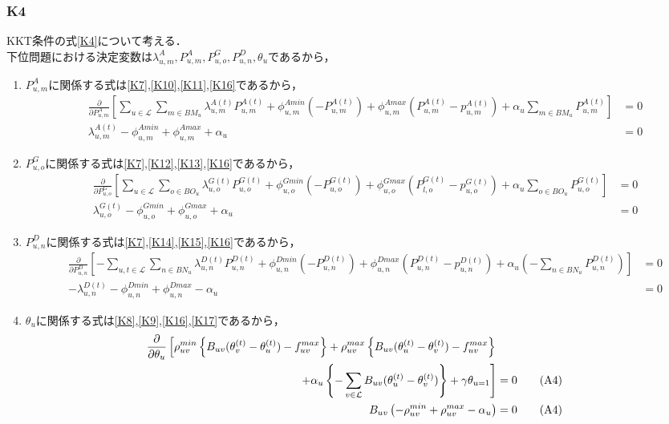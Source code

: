 \documentclass[a4j,10.5pt,fleqn]{jarticle}
\begin{document}
\subsubsection{K4}
KKT条件の式\ref{K4}について考える．\\
下位問題における決定変数は$\lambda_{u,m}^{A},P_{u,m}^A,P_{u,o}^G,P_{u,n}^D,\theta_u$であるから，
\begin{enumerate}
\item $P_{u,m}^A$に関係する式は\ref{K7},\ref{K10},\ref{K11},\ref{K16}であるから，
\begin{align}
&\frac{\partial}{\partial P_{u,m}^A}\left[\sum_{u\in \mathcal{L}}\sum_{m\in BM_u}\lambda^{A(t)}_{u,m}P^{A(t)}_{u,m}+\phi_{u,m}^{Amin}(-P_{u,m}^{A(t)})+\phi_{u,m}^{Amax}(P_{u,m}^{A(t)}-p_{u,m}^{A(t)})+\alpha_u\sum_{m\in BM_u}P^{A(t)}_{u,m}\right]&=0\tag{A1}\\
&\lambda^{A(t)}_{u,m}-\phi_{u,m}^{Amin}+\phi_{u,m}^{Amax}+\alpha_u&=0\tag{A1}\label{A1}
\end{align}
\item $P_{u,o}^G$に関係する式は\ref{K7},\ref{K12},\ref{K13},\ref{K16}であるから，
\begin{align}
&\frac{\partial}{\partial P_{u,o}^G}\left[\sum_{u\in \mathcal{L}}\sum_{o\in BO_u}\lambda^{G(t)}_{u,o}P^{G(t)}_{u,o}+\phi_{u,o}^{Gmin}(-P_{u,o}^{G(t)})+\phi_{u,o}^{Gmax}(P_{l,o}^{G(t)}-p_{u,o}^{G(t)})+\alpha_u\sum_{o\in BO_u}P^{G(t)}_{u,o}\right]&=0\tag{A2}\\
&\lambda^{G(t)}_{u,o}-\phi_{u,o}^{Gmin}+\phi_{u,o}^{Gmax}+\alpha_u&=0\tag{A2}\label{A2}
\end{align}
\item $P_{u,n}^D$に関係する式は\ref{K7},\ref{K14},\ref{K15},\ref{K16}であるから，
\begin{align}
&\frac{\partial}{\partial P_{u,n}^D}\left[-\sum_{u,t\in \mathcal{L}}\sum_{n\in BN_u}\lambda^{D(t)}_{u,n}P^{D(t)}_{u,n}+\phi_{u,n}^{Dmin}(-P_{u,n}^{D(t)})+\phi_{u,n}^{Dmax}(P_{u,n}^{D(t)}-p_{u,n}^{D(t)})+\alpha_u(-\sum_{n\in BN_u}P^{D(t)}_{u,n})\right]&=0\tag{A3}\\
&-\lambda^{D(t)}_{u,n}-\phi_{u,n}^{Dmin}+\phi_{u,n}^{Dmax}-\alpha_u&=0\label{A3}\tag{A3}
\end{align}
\item $\theta_u$に関係する式は\ref{K8},\ref{K9},\ref{K16},\ref{K17}であるから，
\begin{align}
\frac{\partial}{\partial \theta_u}\left[\rho_{uv}^{min}\left\{ B_{uv}(\theta_v^{(t)}-\theta_u^{(t)})-f_{uv}^{max}\right\}+\rho_{uv}^{max}\left\{ B_{uv}(\theta_u^{(t)}-\theta_v^{(t)})-f_{uv}^{max}\right\}\notag \right. \\
\left.+\alpha_u\left\{-\sum_{v\in \mathcal{L}}B_{uv}(\theta_u^{(t)}-\theta_v^{(t)})\right\}+\gamma\theta_{u=1} \right]&=0\tag{A4}\\
B_{uv}\left(-\rho_{uv}^{min}+\rho_{uv}^{max}-\alpha_u\right)&=0\label{A4}\tag{A4}
\end{align}
\end{enumerate}
\end{document}
